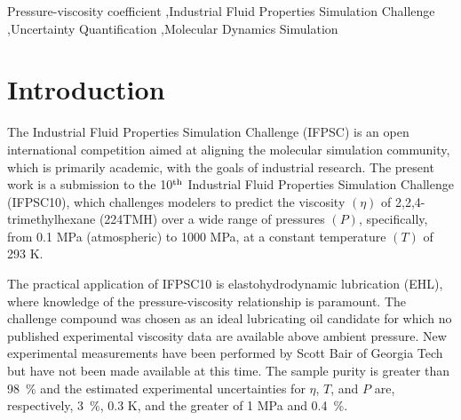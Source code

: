\documentclass[preprint,review,12pt]{elsarticle}
\begin{document}
\begin{frontmatter}
\begin{abstract}
		\end{abstract}
		
		\begin{keyword}
			
			
			
			Pressure-viscosity coefficient \sep Industrial Fluid Properties Simulation Challenge \sep Uncertainty Quantification \sep Molecular Dynamics Simulation
			
		\end{keyword}
		
	\end{frontmatter}	
		
	\section{Introduction}
	
	The Industrial Fluid Properties Simulation Challenge (IFPSC) is an open international competition aimed at aligning the molecular simulation community, which is primarily academic, with the goals of industrial research. The present work is a submission to the 10$^{\rm th}$ Industrial Fluid Properties Simulation Challenge (IFPSC10), which challenges modelers to predict the viscosity $(\eta)$ of 2,2,4-trimethylhexane (224TMH) over a wide range of pressures $(P)$, specifically, from 0.1 MPa (atmospheric) to 1000 MPa, at a constant temperature $(T)$ of 293 K.
	
    The practical application of IFPSC10 is elastohydrodynamic lubrication (EHL), where knowledge of the pressure-viscosity relationship is paramount. The challenge compound was chosen as an ideal lubricating oil candidate for which no published experimental viscosity data are available above ambient pressure. New experimental measurements have been performed by Scott Bair of Georgia Tech but have not been made available at this time. The sample purity is greater than 98~\% and the estimated experimental uncertainties for $\eta$, $T$, and $P$ are, respectively, 3~\%, 0.3 K, and the greater of 1 MPa and 0.4~\%.
	
\end{document}
